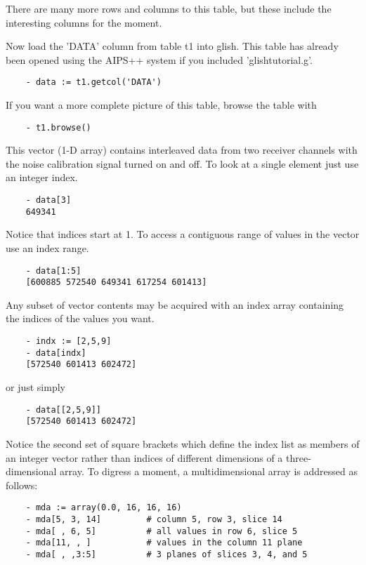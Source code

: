 There are many more rows and columns to this table, but these include the
interesting columns for the moment.

Now load the 'DATA' column from table t1 into glish.  This table has
already been opened using the AIPS++  system if
you included 'glishtutorial.g'.

\begin{verbatim}
	- data := t1.getcol('DATA')
\end{verbatim}

If you want a more complete picture of this table, browse the table
with

\begin{verbatim}
	- t1.browse()
\end{verbatim}

This vector (1-D array) contains interleaved data from two receiver channels
with the noise calibration signal turned on and off.  To look at a single
element just use an integer index.

\begin{verbatim}
	- data[3]
	649341 
\end{verbatim}

Notice that indices start at 1.  To access a contiguous range of values in
the vector use an index range.

\begin{verbatim}
	- data[1:5]
	[600885 572540 649341 617254 601413]
\end{verbatim}

Any subset of vector contents may be acquired with an index array containing
the indices of the values you want.

\begin{verbatim}
	- indx := [2,5,9]
	- data[indx]
	[572540 601413 602472]
\end{verbatim}

or just simply

\begin{verbatim}
	- data[[2,5,9]]
	[572540 601413 602472]
\end{verbatim}

Notice the second set of square brackets which define the index list as
members of an integer vector rather than indices of different dimensions of
a three-dimensional array.  To digress a moment, a multidimensional array
is addressed as follows:

\begin{verbatim}
	- mda := array(0.0, 16, 16, 16)
	- mda[5, 3, 14]			# column 5, row 3, slice 14
	- mda[ , 6, 5]			# all values in row 6, slice 5
	- mda[11, , ]			# values in the column 11 plane
	- mda[ , ,3:5]			# 3 planes of slices 3, 4, and 5
\end{verbatim}

